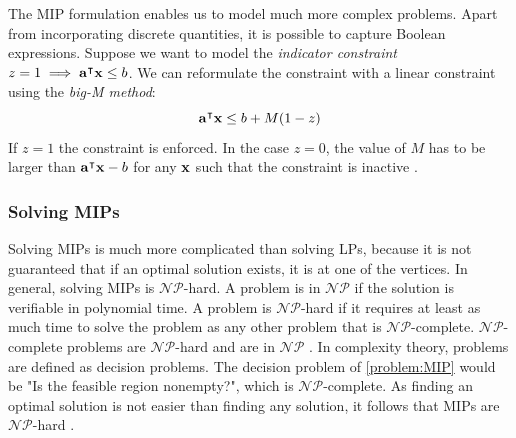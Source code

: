 The MIP formulation enables us to model much more complex problems. Apart from incorporating discrete quantities, it is possible to capture Boolean expressions. Suppose we want to model the \textit{indicator constraint} $z = 1 \implies \bold a^\intercal \bold x \leq b$. We can reformulate the constraint with a linear constraint using the \textit{big-M method}: 
\begin{equation*}
    \bold a^\intercal \bold x \leq b + M(1-z)
\end{equation*}
If $z=1$ the constraint is enforced. In the case $z=0$, the value of $M$ has to be larger than $\bold a^\intercal \bold x - b$ for any $\bold x$ such that the constraint is inactive \cite{aps_mosek_nodate}.

\subsubsection*{Solving MIPs} 
Solving MIPs is much more complicated than solving LPs, because it is not guaranteed that if an optimal solution exists, it is at one of the vertices. In general, solving MIPs is $\mathcal{NP}$-hard. A problem is in $\mathcal{NP}$ if the solution is verifiable in polynomial time. A problem is $\mathcal{NP}$-hard if it requires at least as much time to solve the problem as any other problem that is $\mathcal{NP}$-complete. $\mathcal{NP}$-complete problems are $\mathcal{NP}$-hard and are in $\mathcal{NP}$ \cite{CormenIntroduction}. In complexity theory, problems are defined as decision problems. 
The decision problem of \cref{problem:MIP} would be "Is the feasible region nonempty?", which is $\mathcal{NP}$-complete. As finding an optimal solution is not easier than finding any solution, it follows that MIPs are $\mathcal{NP}$-hard \cite{integer_programming}.


